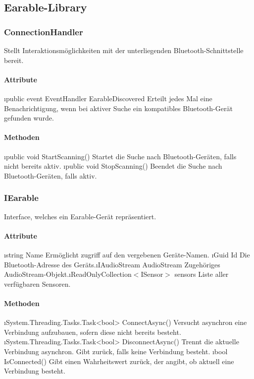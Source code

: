 \documentclass[../entwurf.tex]{subfiles}
\begin{document}
\subsection{Earable-Library}

\subsubsection{ConnectionHandler}
Stellt Interaktionsmöglichkeiten mit der unterliegenden Bluetooth-Schnittstelle bereit.
\paragraph{Attribute}
\begin{itemize}
	\i{public event EventHandler EarableDiscovered} Erteilt jedes Mal eine Benachrichtigung, wenn bei aktiver Suche ein kompatibles Bluetooth-Gerät gefunden wurde.\footnotemark[1]
\end{itemize}
\paragraph{Methoden}
\begin{itemize}
	\i{public void StartScanning()} Startet die Suche nach Bluetooth-Geräten, falls nicht bereits aktiv.
	\i{public void StopScanning()} Beendet die Suche nach Bluetooth-Geräten, falls aktiv.
\end{itemize}

\subsubsection{IEarable}
Interface, welches ein Earable-Gerät repräsentiert.
\paragraph{Attribute}
\begin{itemize}
	\i{string Name} Ermöglicht zugriff auf den vergebenen Geräte-Namen.
	\i{Guid Id} Die Bluetooth-Adresse des Geräts.\footnotemark[1]
	\i{IAudioStream AudioStream} Zugehöriges AudioStream-Objekt.\footnotemark[1]
	\i{ReadOnlyCollection$<$ISensor$>$ sensors} Liste aller verfügbaren Sensoren.\footnotemark[1]
\end{itemize}
\paragraph{Methoden}
\begin{itemize}
	\i{System.Threading.Tasks.Task<bool> ConnectAsync()} Versucht asynchron eine Verbindung aufzubauen, sofern diese nicht bereits besteht.
	\i{System.Threading.Tasks.Task<bool> DisconnectAsync()} Trennt die aktuelle Verbindung asynchron. Gibt  zurück, falls keine Verbindung besteht.
	\i{bool IsConnected()} Gibt einen Wahrheitswert zurück, der angibt, ob aktuell eine Verbindung besteht.
\end{itemize}
\end{document}
